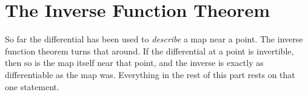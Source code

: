 \chapter{The Inverse Function Theorem}
\label{ch:inverse_function_theorem}

So far the differential has been used to \emph{describe} a map near a point. The inverse function
theorem turns that around. If the differential at a point is invertible, then so is the map
itself near that point, and the inverse is exactly as differentiable as the map was. Everything
in the rest of this part rests on that one statement.



